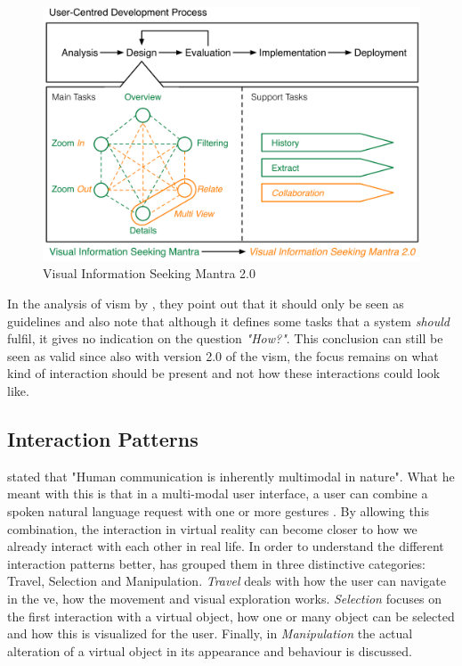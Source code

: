 \begin{figure}[h!]
	\begin{center}
		\includegraphics[width=12cm]{03_Figures/05_LitReview/Stauffer2016_VISM2.png}
		\caption[Visual Information Seeking Mantra 2.0]{Visual Information Seeking Mantra 2.0 \citep{Stauffer2016}}
		\label{fig:vism2}
	\end{center}
\end{figure}

In the analysis of \gls{vism} by \cite{Craft2005}, they point out that it should only be seen as guidelines and also note that although it defines some tasks that a system \textit{should} fulfil, it gives no indication on the question \textit{"How?"}. This conclusion can still be seen as valid since also with version 2.0 of the \gls{vism}, the focus remains on what kind of interaction should be present and not how these interactions could look like.



\subsection{Interaction Patterns}

\label{SubSectionInteractionPatterns}

\cite{Bunt1998} stated that "Human communication is inherently multimodal in nature". What he meant with this is that in a multi-modal user interface, a user can combine a spoken natural language request with one or more gestures \citep{Rosson2002}. By allowing this combination, the interaction in virtual reality can become closer to how we already interact with each other in real life. \newline
In order to understand the different interaction patterns better, \cite{Bowman2002} has grouped them in three distinctive categories: Travel, Selection and Manipulation. \textit{Travel} deals with how the user can navigate in the \gls{ve}, how the movement and visual exploration works. \textit{Selection} focuses on the first interaction with a virtual object, how one or many object can be selected and how this is visualized for the user. Finally, in \textit{Manipulation} the actual alteration of a virtual object in its appearance and behaviour is discussed.


